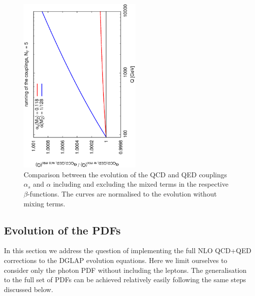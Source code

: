 \begin{figure}[h]
\includegraphics[width=6cm,angle=270]{figs/couplings.eps} 
\caption{Comparison between the evolution of the QCD and QED couplings
  $\alpha_s$ and $\alpha$ including and excluding the mixed terms in
  the respective $\beta$-functions. The curves are normalised to the
  evolution without mixing terms.}
\label{fig:CouplingEvol}
\end{figure}

\subsection{Evolution of the PDFs}

In this section we address the question of implementing the full NLO
QCD+QED corrections to the DGLAP evolution equations. Here we limit
ourselves to consider only the photon PDF without including the
leptons. The generalisation to the full set of PDFs can be achieved
relatively easily following the same steps discussed below.

